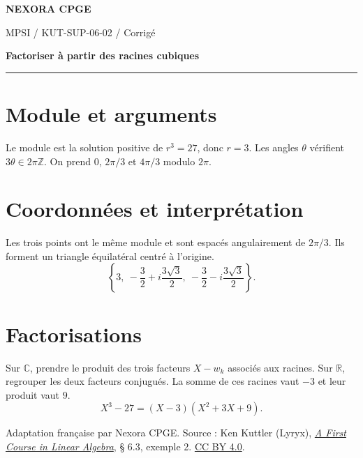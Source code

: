 \documentclass[11pt,a4paper]{article}
\begin{document}
{\small\bfseries\color{nexorablue} NEXORA CPGE}\par
{\small MPSI / KUT-SUP-06-02 / Corrigé}\par
{\LARGE\bfseries Factoriser à partir des racines cubiques}\par
\vspace{0.25em}\hrule\vspace{0.6em}

\section*{Module et arguments}
Le module est la solution positive de $r^3=27$, donc $r=3$. Les angles $\theta$ vérifient $3\theta\in2\pi\mathbb Z$. On prend $0$, $2\pi/3$ et $4\pi/3$ modulo $2\pi$.

\section*{Coordonnées et interprétation}
Les trois points ont le même module et sont espacés angulairement de $2\pi/3$. Ils forment un triangle équilatéral centré à l’origine.
\[ \left\{3,\ -\frac32+i\frac{3\sqrt3}{2},\ -\frac32-i\frac{3\sqrt3}{2}\right\}. \]

\section*{Factorisations}
Sur $\mathbb C$, prendre le produit des trois facteurs $X-w_k$ associés aux racines. Sur $\mathbb R$, regrouper les deux facteurs conjugués. La somme de ces racines vaut $-3$ et leur produit vaut $9$.
\[ X^3-27=(X-3)(X^2+3X+9). \]

\bigskip
{\footnotesize Adaptation française par Nexora CPGE. Source : Ken Kuttler (Lyryx),
\href{https://math.libretexts.org/Bookshelves/Linear_Algebra/A_First_Course_in_Linear_Algebra_(Kuttler)/06:_Complex_Numbers/6.03:_Roots_of_Complex_Numbers}{\textit{A First Course in Linear Algebra}}, § 6.3, exemple 2.
\href{https://creativecommons.org/licenses/by/4.0/}{CC BY 4.0}.}
\end{document}
